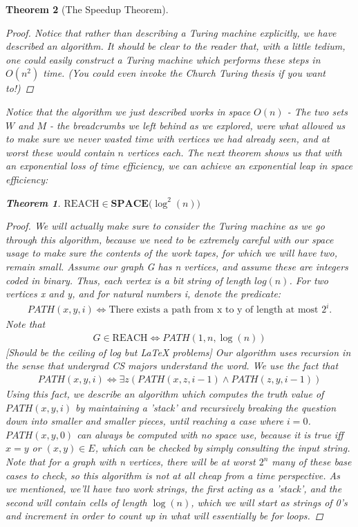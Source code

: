 \documentclass{article}
\theoremstyle{definition}
\theoremstyle{plain}
\theoremstyle{theorem}
\newtheorem{theorem}{Theorem}[section]
\begin{document}
\begin{theorem}[The Speedup Theorem]
\begin{proof}
\par Notice that rather than describing a Turing machine explicitly, we have described an algorithm. It should be clear to the reader that, with a little tedium, one could easily construct a Turing machine which performs these steps in $O(n^2)$ time. (You could even invoke the Church Turing thesis if you want to!)
\end{proof}
Notice that the algorithm we just described works in space $O(n)$ - The two sets $W$ and $M$ - the breadcrumbs we left behind as we explored, were what allowed us to make sure we never wasted time with vertices we had already seen, and at worst these would contain $n$ vertices each. The next theorem shows us that with an exponential loss of time efficiency, we can achieve an exponential leap in space efficiency:
\begin{theorem}
    $\textrm{REACH} \in \textbf{SPACE($\log^2(n)$)}$
\end{theorem}
\begin{proof}
We will actually make sure to consider the Turing machine as we go through this algorithm, because we need to be extremely careful with our space usage to make sure the contents of the work tapes, for which we will have two, remain small. Assume our graph G has n vertices, and assume these are integers coded in binary. Thus, each vertex is a bit string of length $log(n)$. For two vertices x and y, and for natural numbers i, denote the predicate:
\begin{align}
    PATH(x,y,i) \iff \textrm{There exists a path from x to y of length at most $2^i$.}
\end{align}
Note that 
\begin{align}
    G \in \textrm{REACH} \iff PATH(1,n,\log(n))
\end{align}
[Should be the ceiling of log but LaTeX problems]
Our algorithm uses recursion in the sense that undergrad CS majors understand the word. We use the fact that 
\begin{align}
    PATH(x,y,i) \iff \exists z (PATH(x,z,i-1)\wedge PATH(z,y,i-1))
\end{align}
Using this fact, we describe an algorithm which computes the truth value of $PATH(x,y,i)$ by maintaining a 'stack' and recursively breaking the question down into smaller and smaller pieces, until reaching a case where $i=0$. $PATH(x,y,0)$ can always be computed with no space use, because it is true iff $x=y$ or $(x,y) \in E$, which can be checked by simply consulting the input string. Note that for a graph with n vertices, there will be at worst $2^n$ many of these base cases to check, so this algorithm is not at all cheap from a time perspective. As we mentioned, we'll have two work strings, the first acting as a 'stack', and the second will contain cells of length $\log(n)$, which we will start as strings of 0's and increment in order to count up in what will essentially be for loops. 

\end{proof}
\end{theorem}
\end{document}
